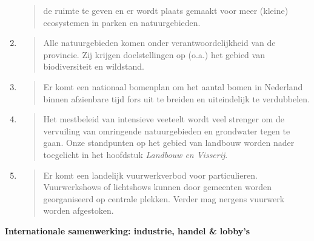 \begin{enumerate}
\begin{quote}
  de ruimte te geven en er wordt plaats gemaakt voor meer (kleine)
  ecosystemen in parken en natuurgebieden.
  \end{quote}
\item
  \begin{quote}
  Alle natuurgebieden komen onder verantwoordelijkheid van de provincie.
  Zij krijgen doelstellingen op (o.a.) het gebied van biodiversiteit en
  wildstand.
  \end{quote}
\item
  \begin{quote}
  Er komt een nationaal bomenplan om het aantal bomen in Nederland
  binnen afzienbare tijd fors uit te breiden en uiteindelijk te
  verdubbelen.
  \end{quote}
\item
  \begin{quote}
  Het mestbeleid van intensieve veeteelt wordt veel strenger om de
  vervuiling van omringende natuurgebieden en grondwater tegen te gaan.
  Onze standpunten op het gebied van landbouw worden nader toegelicht in
  het hoofdstuk \emph{Landbouw en Visserij}.
  \end{quote}
\item
  \begin{quote}
  Er komt een landelijk vuurwerkverbod voor particulieren. Vuurwerkshows
  of lichtshows kunnen door gemeenten worden georganiseerd op centrale
  plekken. Verder mag nergens vuurwerk worden afgestoken.
  \end{quote}
\end{enumerate}

\textbf{Internationale samenwerking: industrie, handel \& lobby's}

